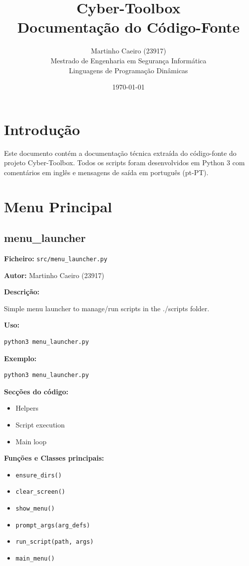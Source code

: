 \documentclass[a4paper,11pt]{article}
\title{Cyber-Toolbox \\ Documentação do Código-Fonte}
\author{Martinho Caeiro (23917) \\ Mestrado de Engenharia em Segurança Informática \\ Linguagens de Programação Dinâmicas}
\date{\today}
\begin{document}
\maketitle
\tableofcontents
\newpage

\section{Introdução}
Este documento contém a documentação técnica extraída do código-fonte do projeto Cyber-Toolbox.
Todos os scripts foram desenvolvidos em Python 3 com comentários em inglês e mensagens de saída em português (pt-PT).

\section{Menu Principal}

\subsection{menu\_launcher}
\label{sec:menu_launcher}

\textbf{Ficheiro:} \texttt{src/menu\_launcher.py}

\textbf{Autor:} Martinho Caeiro (23917)

\textbf{Descrição:}

Simple menu launcher to manage/run scripts in the ./scripts folder.

\textbf{Uso:}
\begin{verbatim}
python3 menu_launcher.py
\end{verbatim}

\textbf{Exemplo:}
\begin{verbatim}
python3 menu_launcher.py
\end{verbatim}

\textbf{Secções do código:}
\begin{itemize}
    \item Helpers
    \item Script execution
    \item Main loop
\end{itemize}

\textbf{Funções e Classes principais:}
\begin{itemize}
    \item \texttt{ensure\_dirs()}
    \item \texttt{clear\_screen()}
    \item \texttt{show\_menu()}
    \item \texttt{prompt\_args(arg\_defs)}
    \item \texttt{run\_script(path, args)}
    \item \texttt{main\_menu()}
\end{itemize}
\end{document}

